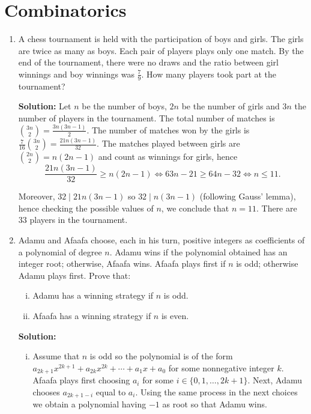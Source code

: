 \documentclass{article}
\newcommand{\solution}[1]{%
\ifsolutions%
    \textbf{Solution: } #1
\fi
}
\begin{document}
\section{Combinatorics}
\begin{enumerate}

\item A chess tournament is held with the participation of boys and girls. The girls are twice as many as boys. Each pair of players plays only one match. By the end of the tournament, there were no draws and the ratio between girl winnings and boy winnings was $\frac{7}{9}$. How many players took part at the tournament?

\solution{Let $n$ be the number of boys, $2n$ be the number of girls and $3n$ the number of players in the tournament. The total number of matches is $\binom{3n}{2} = \frac{3n(3n - 1)}{2}$. The number of matches won by the girls is $\frac{7}{16} \binom{3n}{2} = \frac{21n(3n - 1)}{32}$. The matches played between girls are $\binom{2n}{2} = n(2n - 1)$ and count as winnings for girls, hence
\[
    \frac{21n(3n - 1)}{32} \geq n(2n - 1) \iff 63n - 21 \geq 64n - 32 \iff n \leq 11.
\]

Moreover, $32 \mid 21n(3n - 1)$ so $32 \mid n(3n - 1)$ (following Gauss' lemma), hence checking the possible values of $n$, we conclude that $n = 11$. There are $33$ players in the tournament.}

\item Adamu and Afaafa choose, each in his turn, positive integers as coefficients of a polynomial of degree $n$. Adamu wins if the polynomial obtained has an integer root; otherwise, Afaafa wins. Afaafa plays first if $n$ is odd; otherwise Adamu plays first. Prove that:
\begin{enumerate}[i)]

\item Adamu has a winning strategy if $n$ is odd.

\item Afaafa has a winning strategy if $n$ is even.

\end{enumerate}

\solution{%
\begin{enumerate}[i)]

\item Assume that $n$ is odd so the polynomial is of the form $a_{2k + 1} x^{2k + 1} + a_{2k} x^{2k} + \cdots + a_1 x + a_0$ for some nonnegative integer $k$. Afaafa plays first choosing $a_i$ for some $i \in \{ 0, 1, \dots, 2k + 1 \}$. Next, Adamu chooses $a_{2k + 1 - i}$ equal to $a_i$. Using the same process in the next choices we obtain a polynomial having $-1$ as root so that Adamu wins.


\end{enumerate}}
\end{enumerate}
\end{document}
